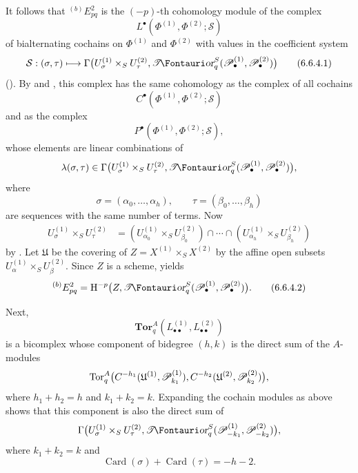 \begin{env}[6.6.4]
It follows that ${}^{(b)}E_{pq}^2$ is the $(-p)$-th cohomology
module of the complex
\[
  L^\bullet(\Phi^{(1)},\Phi^{(2)};\mathcal S)
\]
of bialternating cochains on $\Phi^{(1)}$ and $\Phi^{(2)}$ with
values in the coefficient system
\[
  \mathcal S:(\sigma,\tau)\longmapsto
  \Gamma\bigl(
    U_\sigma^{(1)}\times_SU_\tau^{(2)},
    \shTor_q^S(\sh P_\bullet^{(1)},\sh P_\bullet^{(2)})
  \bigr)
  \tag{6.6.4.1}\label{III.6.6.4.1}
\]
().  By  and
, this complex has the same cohomology as the
complex of all cochains
\[
  C^\bullet(\Phi^{(1)},\Phi^{(2)};\mathcal S)
\]
and as the complex
\[
  P^\bullet(\Phi^{(1)},\Phi^{(2)};\mathcal S),
\]
whose elements are linear combinations of
\[
  \lambda(\sigma,\tau)\in
  \Gamma\bigl(
    U_\sigma^{(1)}\times_SU_\tau^{(2)},
    \shTor_q^S(\sh P_\bullet^{(1)},\sh P_\bullet^{(2)})
  \bigr),
\]
where
\[
  \sigma=(\alpha_0,\ldots,\alpha_h),
  \qquad
  \tau=(\beta_0,\ldots,\beta_h)
\]
are sequences with the same number of terms.  Now
\[
\begin{split}
  U_\sigma^{(1)}\times_SU_\tau^{(2)}
  &=
  (U_{\alpha_0}^{(1)}\times_SU_{\beta_0}^{(2)})
  \cap\cdots\cap
  (U_{\alpha_h}^{(1)}\times_SU_{\beta_h}^{(2)})
\end{split}
\]
by .  Let $\mathfrak U$ be the covering of
$Z=X^{(1)}\times_SX^{(2)}$ by the affine open subsets
$U_\alpha^{(1)}\times_SU_\beta^{(2)}$.  Since $Z$ is a scheme,
 yields
\[
  {}^{(b)}E_{pq}^2
  =
  \HH^{-p}
  \bigl(
    Z,\shTor_q^S
    (\sh P_\bullet^{(1)},\sh P_\bullet^{(2)})
  \bigr).
  \tag{6.6.4.2}\label{III.6.6.4.2}
\]

Next,
\[
  \mathbf{Tor}_q^A
  (L_{\bullet\bullet}^{(1)},L_{\bullet\bullet}^{(2)})
\]
is a bicomplex whose component of bidegree $(h,k)$ is the direct
sum of the $A$-modules
\[
  \operatorname{Tor}_q^A
  \bigl(
    C^{-h_1}(\mathfrak U^{(1)},\mathscr{P}_{k_1}^{(1)}),
    C^{-h_2}(\mathfrak U^{(2)},\mathscr{P}_{k_2}^{(2)})
  \bigr),
\]
where $h_1+h_2=h$ and $k_1+k_2=k$.  Expanding the cochain
modules as above shows that this component is also the direct
sum of
\[
  \Gamma\bigl(
    U_\sigma^{(1)}\times_SU_\tau^{(2)},
    \shTor_q^S(\sh P_{-k_1}^{(1)},\sh P_{-k_2}^{(2)})
  \bigr),
\]
where $k_1+k_2=k$ and
\[
  \operatorname{Card}(\sigma)
  +\operatorname{Card}(\tau)=-h-2.
\]


\end{env}
